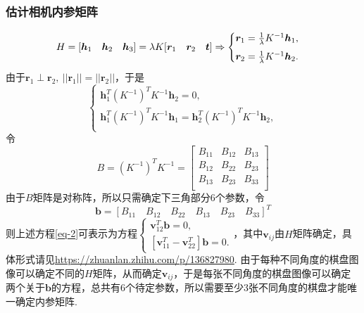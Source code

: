 \documentclass[12pt, a4paper, oneside]{ctexart}
\numberwithin{equation}{section}  %
\def\bd{\boldsymbol}        %
\def\add{\vspace{1ex}}      %
\def\del{\vspace{-1.5ex}}   %
\begin{document}
\subsubsection{估计相机内参矩阵}\del
\begin{equation}
    \label{eq-1}
    H = [\bd{h}_1\quad \bd{h}_2\quad \bd{h}_3] = \lambda K[\bd{r}_1\quad \bd{r}_2\quad \bd{t}]\Rightarrow\begin{cases}
        \bd{r}_1 = \frac{1}{\lambda}K^{-1}\bd{h}_1,\add\\
        \bd{r}_2 = \frac{1}{\lambda}K^{-1}\bd{h}_2.
    \end{cases}
\end{equation}
由于$\bd{r}_1\perp \bd{r}_2,\ ||\bd{r}_1||=||\bd{r}_2||$，于是
\begin{equation}
    \label{eq-2}
    \begin{cases}
        \bd{h}_1^T(K^{-1})^TK^{-1}\bd{h}_2 = 0,\\
        \bd{h}_1^T(K^{-1})^TK^{-1}\bd{h}_1 = \bd{h}_2^T(K^{-1})^TK^{-1}\bd{h}_2,\\
    \end{cases}
\end{equation}
令
\begin{equation*}
    B = (K^{-1})^TK^{-1} = \left[\begin{matrix}
        B_{11}&B_{12}&B_{13}\\
        B_{12}&B_{22}&B_{23}\\
        B_{13}&B_{23}&B_{33}\\
    \end{matrix}\right]
\end{equation*}
由于$B$矩阵是对称阵，所以只需确定下三角部分$6$个参数，令
\begin{equation*}
    \bd{b} = [B_{11}\quad B_{12}\quad B_{22}\quad B_{13}\quad B_{23}\quad B_{33}]^T
\end{equation*}
则上述方程\ref{eq-2}可表示为方程$\begin{cases}
    \bd{v}_{12}^T\bd{b} = 0,\\
    [\bd{v}_{11}^T-\bd{v}_{22}^T]\bd{b} = 0.
\end{cases}$，其中$\bd{v}_{ij}$由$H$矩阵确定，具体形式请见\url{https://zhuanlan.zhihu.com/p/136827980}. 由于每种不同角度的棋盘图像可以确定不同的$H$矩阵，从而确定$\bd{v}_{ij}$，于是每张不同角度的棋盘图像可以确定两个关于$\bd{b}$的方程，总共有$6$个待定参数，所以需要至少$3$张不同角度的棋盘才能唯一确定内参矩阵.
\end{document}
